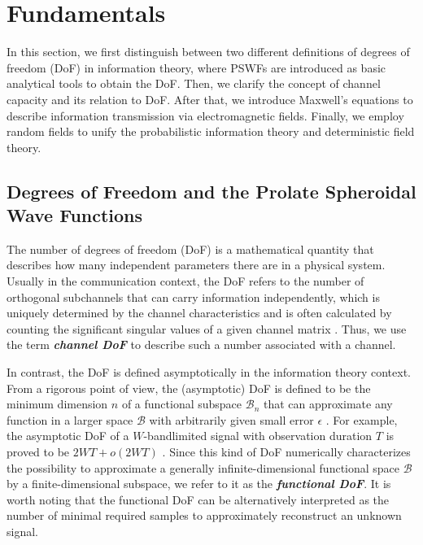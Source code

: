 \documentclass[journal,twocolumn]{IEEEtran}
\begin{document}
\section{Fundamentals}
In this section, we first distinguish between two different definitions of degrees of freedom (DoF) in information theory, where PSWFs are introduced as basic analytical tools to obtain the DoF. 
Then, we clarify the concept of channel capacity and its relation to DoF. 
After that, we introduce Maxwell's equations to describe information transmission via electromagnetic fields. 
Finally, we employ random fields to unify the probabilistic information theory and deterministic field theory. 



\subsection{Degrees of Freedom and the Prolate Spheroidal Wave Functions}
\label{Sec_2_Subsec_1}
The number of degrees of freedom (DoF) is a mathematical quantity that describes how many independent parameters there are in a physical system. 
Usually in the communication context, the DoF refers to the number of orthogonal subchannels that can carry information independently, which is uniquely determined by the channel characteristics and is often calculated by counting the significant singular values of a given channel matrix \cite{goldsmith2003capacity}. 
Thus, we use the term {\textbf{\emph{channel DoF}}} to describe such a number associated with a channel.

In contrast, the DoF is defined asymptotically in the information theory context. From a rigorous point of view, the (asymptotic) DoF is defined to be the minimum dimension $n$ of a functional subspace $\mathcal{B}_n$ that can approximate any function in a larger space $\mathcal{B}$ with arbitrarily given small error $\epsilon$ \cite{poon2005degrees}. For example, the asymptotic DoF of a $W$-bandlimited signal with observation duration $T$ is proved to be $2WT+o(2WT)$ \cite{slepian1976bandwidth}. 
Since this kind of DoF numerically characterizes the possibility to approximate a generally infinite-dimensional functional space $\mathcal{B}$ by a finite-dimensional subspace, we refer to it as the {\textbf{\emph{functional DoF}}}. 
It is worth noting that the functional DoF can be alternatively interpreted as the number of minimal required samples to approximately reconstruct an unknown signal. 
\end{document}
